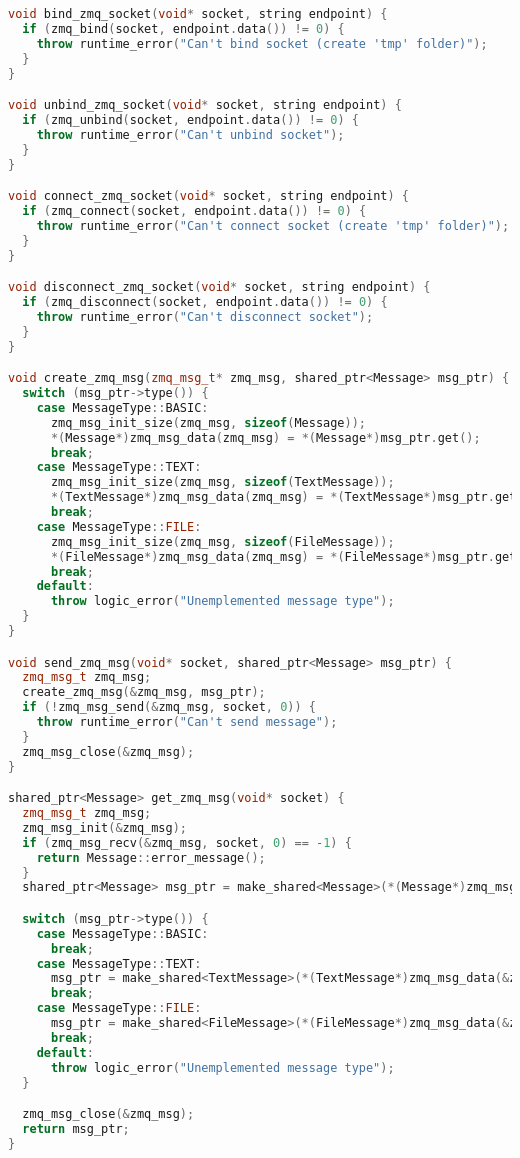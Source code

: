 \begin{lstlisting}[language=C++]
void bind_zmq_socket(void* socket, string endpoint) {
  if (zmq_bind(socket, endpoint.data()) != 0) {
    throw runtime_error("Can't bind socket (create 'tmp' folder)");
  }
}

void unbind_zmq_socket(void* socket, string endpoint) {
  if (zmq_unbind(socket, endpoint.data()) != 0) {
    throw runtime_error("Can't unbind socket");
  }
}

void connect_zmq_socket(void* socket, string endpoint) {
  if (zmq_connect(socket, endpoint.data()) != 0) {
    throw runtime_error("Can't connect socket (create 'tmp' folder)");
  }
}

void disconnect_zmq_socket(void* socket, string endpoint) {
  if (zmq_disconnect(socket, endpoint.data()) != 0) {
    throw runtime_error("Can't disconnect socket");
  }
}

void create_zmq_msg(zmq_msg_t* zmq_msg, shared_ptr<Message> msg_ptr) {
  switch (msg_ptr->type()) {
    case MessageType::BASIC:
      zmq_msg_init_size(zmq_msg, sizeof(Message));
      *(Message*)zmq_msg_data(zmq_msg) = *(Message*)msg_ptr.get();
      break;
    case MessageType::TEXT:
      zmq_msg_init_size(zmq_msg, sizeof(TextMessage));
      *(TextMessage*)zmq_msg_data(zmq_msg) = *(TextMessage*)msg_ptr.get();
      break;
    case MessageType::FILE:
      zmq_msg_init_size(zmq_msg, sizeof(FileMessage));
      *(FileMessage*)zmq_msg_data(zmq_msg) = *(FileMessage*)msg_ptr.get();
      break;
    default:
      throw logic_error("Unemplemented message type");
  }
}

void send_zmq_msg(void* socket, shared_ptr<Message> msg_ptr) {
  zmq_msg_t zmq_msg;
  create_zmq_msg(&zmq_msg, msg_ptr);
  if (!zmq_msg_send(&zmq_msg, socket, 0)) {
    throw runtime_error("Can't send message");
  }
  zmq_msg_close(&zmq_msg);
}

shared_ptr<Message> get_zmq_msg(void* socket) {
  zmq_msg_t zmq_msg;
  zmq_msg_init(&zmq_msg);
  if (zmq_msg_recv(&zmq_msg, socket, 0) == -1) {
    return Message::error_message();
  }
  shared_ptr<Message> msg_ptr = make_shared<Message>(*(Message*)zmq_msg_data(&zmq_msg));

  switch (msg_ptr->type()) {
    case MessageType::BASIC:
      break;
    case MessageType::TEXT:
      msg_ptr = make_shared<TextMessage>(*(TextMessage*)zmq_msg_data(&zmq_msg));
      break;
    case MessageType::FILE:
      msg_ptr = make_shared<FileMessage>(*(FileMessage*)zmq_msg_data(&zmq_msg));
      break;
    default:
      throw logic_error("Unemplemented message type");
  }

  zmq_msg_close(&zmq_msg);
  return msg_ptr;
}

\end{lstlisting}

